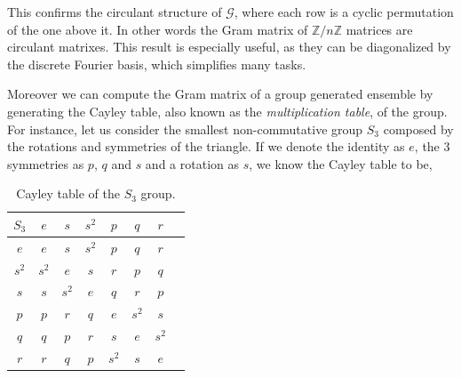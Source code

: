 \documentclass[12pt,letterpaper]{article}
\begin{document}
\begin{multicols}{2}
This confirms the circulant structure of $\mathcal{G}$, where each row is a cyclic permutation of the one above it. In other words the Gram matrix of $\mathbb{Z}/n\mathbb{Z}$ matrices are circulant matrixes. This result is especially useful, as they can be diagonalized by the discrete Fourier basis, which simplifies many tasks\cite{circulantMatrices}.

Moreover we can compute the Gram matrix of a group generated ensemble by generating the Cayley table, also known as the \emph{multiplication table}, of the group. For instance, let us consider the smallest non-commutative group $S_3$ composed by the rotations and symmetries of the triangle. If we denote the identity as $e$, the 3 symmetries as $p$, $q$ and $s$ and a rotation as $s$, we know the Cayley table to be,
\begin{table}[H]
	\centering
	\caption{Cayley table of the $S_3$ group.}
	\begin{tabular}{c||c c c c c c c}
        $S_3$ & $e$ & $s$ & $s^2$ & $p$ & $q$ & $r$ \\\hline\hline
        $e$   & $e$ & $s$ & $s^2$ & $p$ & $q$ & $r$ \\
        $s^2$ & $s^2$ & $e$ & $s$ & $r$ & $p$ & $q$ \\
        $s$   & $s$ & $s^2$ & $e$ & $q$ & $r$ & $p$ \\
        $p$ & $p$ & $r$ & $q$ & $e$ & $s^2$ & $s$ \\
        $q$ & $q$ & $p$ & $r$ & $s$ & $e$ & $s^2$ \\
        $r$ & $r$ & $q$ & $p$ & $s^2$ & $s$ & $e$
    \end{tabular}
\end{table}


\end{multicols}
\end{document}
